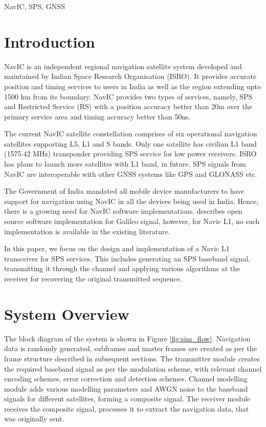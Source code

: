 \documentclass[conference]{IEEEtran}
\begin{document}
\begin{IEEEkeywords}
NavIC, SPS, GNSS 
\end{IEEEkeywords}

\section{Introduction}
NavIC \cite{b2} is an independent regional navigation satellite system developed and maintained by Indian Space Research 
Organisation (ISRO). 
It provides accurate position and timing services to users in India as well as the region extending
upto 1500 km from its boundary. NavIC provides two types of services, namely, SPS   and Restricted Service (RS) with a position accuracy better than 20m over the 
primary service area and timing accuracy better than 50ns.  

The current NavIC satellite constellation comprises of six operational navigation satellites
supporting L5, L1 and S bands. Only one satellite has civilian L1 band (1575.42 MHz) transponder providing SPS service 
for low power receivers. ISRO has plans to launch more satellites with L1 band, in future. 
SPS signals from NavIC are interoperable with other GNSS systems like GPS and GLONASS etc. 

The Government of India mandated all mobile device manufacturers to have support for navigation 
using NavIC in all the devices being used in India. Hence, there is a growing need for NavIC 
software implementations. \cite{b1} describes open source software implementation for Galileo signal,
however, for Navic L1, no such implementation is available in the existing literature. 

In this paper, we 
focus on the design and implementation of a Navic L1 
transceiver for SPS services. 
This includes generating an SPS baseband signal,
transmitting it through the channel 
and applying various algorithms at the receiver for recovering the original transmitted sequence. 

\section{System Overview}
The block diagram of the system is shown in Figure \ref{fig:sim_flow}. Navigation data is randomly 
generated, subframes and master frames are created as per the frame structure described in 
subsequent sections. The transmitter module creates the required baseband signal as per the  
modulation scheme, with relevant channel encoding schemes, error correction and detection schemes. 
Channel modelling module adds various modelling parameters and AWGN noise to the baseband signals 
for different satellites, forming a composite signal. The receiver module receives the composite 
signal, processes it to extract the navigation data, that was originally sent.   
\end{document}
